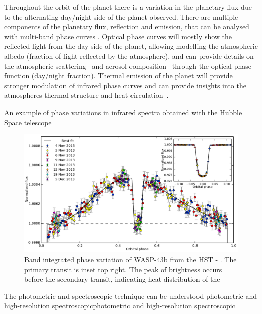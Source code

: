 Throughout the orbit of the planet there is a variation in the planetary flux due to the alternating day/night side of the planet observed.
There are multiple components of the planetary flux, reflection and emission,  that can be analysed with multi-band phase curves \citep[e.g.][]{knutson_characterizing_2009, esteves_optical_2013}. Optical phase curves will mostly show the reflected light from the day side of the planet, allowing modelling the atmospheric albedo (fraction of light reflected by the atmosphere), and can provide details on the atmospheric scattering~\citep{madhusudhan_analytic_2012} and aerosol composition~\citep{oreshenko_optical_2016} through the optical phase function (day/night fraction). Thermal emission of the planet will provide stronger modulation of infrared phase curves and can provide insights into the atmospheres thermal
structure and heat circulation~\citep{ goodman_thermodynamics_2009, koll_temperature_2016 }.


An example of phase variations in infrared spectra obtained with the Hubble Space telescope 
\begin{figure}
    \centering
    \includegraphics[width=0.6\linewidth]{figures/introduction/stevenson_phasecurve2014}
    \caption{Band integrated phase variation of WASP-43b from the HST - \cite{stevenson_thermal_2014}. The primary transit is inset top right.
        The peak of brightness occurs before the secondary transit, indicating heat distribution of the }
    \label{fig:stevensonphasecurve2014}
\end{figure}



The photometric and spectroscopic technique can be understood 
photometric and high-resolution spectroscopicphotometric and high-resolution spectroscopic

